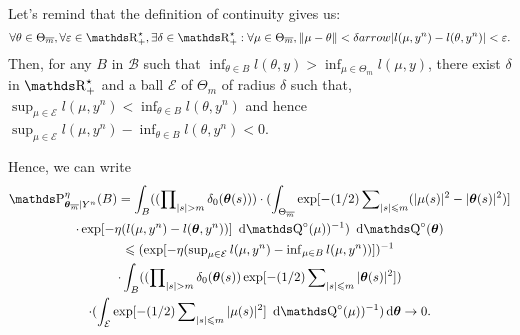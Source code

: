 \begin{pro}\label{PRO_BAYES_SIEVE_SELF_INFORMATIVE}
Let's remind that the definition of continuity gives us:
\[\forall \theta \in \Theta_{\overline{m}}, \forall \epsilon \in \R_{+}^{\star}, \exists \delta \in \R_{+}^{\star} : \forall \mu \in \Theta_{\overline{m}}, \Vert \mu - \theta \Vert < \delta arrow \vert l(\mu, y^{n}) - l(\theta, y^{n}) \vert < \epsilon.\]
Then, for any $B$ in $\mathcal{B}$ such that $\inf\nolimits_{\theta \in B} l(\theta, y) > \inf\nolimits_{\mu \in \Theta_{m}} l(\mu, y)$, there exist $\delta$ in $\R_{+}^{\star}$ and a ball $\mathcal{E}$ of $\Theta_{m}$ of radius $\delta$ such that, $\sup\nolimits_{\mu \in \mathcal{E}} l(\mu, y^{n}) < \inf\nolimits_{\theta \in B}l(\theta, y^{n})$ and hence $\sup\nolimits_{\mu \in \mathcal{E}}l(\mu, y^{n}) - \inf\nolimits_{\theta \in B}l(\theta, y^{n}) < 0$.

Hence, we can write
\begin{multline*}
 \P_{\boldsymbol{\theta}_{\overline{m}}\vert Y^{n}}^{\eta}(B) = 
\int_{B}(
	(
		\prod\nolimits_{\vert s \vert > m} \delta_{0}(\boldsymbol{\theta}(s))
	)
	\cdot (
		\int_{\Theta_{\overline{m}}} \exp
		[-(1/2)\sum\nolimits_{\vert s \vert \leq m}
			(
				\vert \mu(s) \vert^{2} - \vert \boldsymbol{\theta}(s) \vert^{2}
			)
		]
\\
		\cdot \exp
		[
			-\eta
			(
				l(\mu, y^{n}) - l(\boldsymbol{\theta}, y^{n})
			)
		] \, \d \Q^{\circ}(\mu)
	)^{-1}
) \, \d \Q^{\circ}(\boldsymbol{\theta})\\
 \leq (
	\exp
	[
		-\eta
		(
			\sup\nolimits_{\mu \in \mathcal{E}} l(\mu, y^{n}) - \inf\nolimits_{\mu \in B} l(\mu, y^{n})
		)
	]
)^{-1}\\
 \cdot \int_{B}
(
	(
		\prod\nolimits_{\vert s \vert > m} \delta_{0}(\boldsymbol{\theta}(s)) \exp
		[
			-(1/2)\sum\nolimits_{\vert s \vert \leq m} \vert \boldsymbol{\theta}(s) \vert^{2}
		]
	)
\\
	\cdot
	(
		\int\nolimits_{\mathcal{E}}
		\exp
		[
			-(1/2)\sum\nolimits_{\vert s \vert \leq m} \vert \mu(s) \vert^{2}
		] \, \d \Q^{\circ}(\mu)
	)^{-1}
)
\, \text{d} \boldsymbol{\theta} \to 0.
\end{multline*}
\proEnd
\end{pro}

